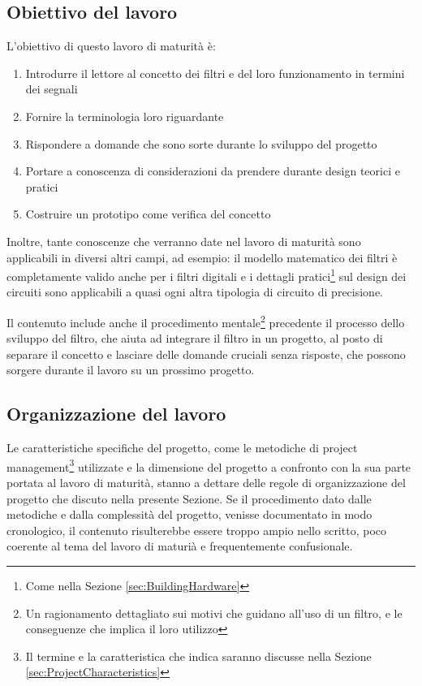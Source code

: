 \documentclass[a4paper, 10pt, final]{article} %
\begin{document}
    \subsection{Obiettivo del lavoro}\label{sec:IntroAim}
    \noindent L'obiettivo di questo lavoro di maturit\`{a} \`{e}:
    \begin{enumerate}[label=\emph{(\roman*)}]
        \item Introdurre il lettore al concetto dei filtri e del loro funzionamento in termini dei segnali
        \item Fornire la terminologia loro riguardante
        \item Rispondere a domande che sono sorte durante lo sviluppo del progetto
        \item Portare a conoscenza di considerazioni da prendere durante design teorici e pratici 
        \item Costruire un prototipo come verifica del concetto
    \end{enumerate}
    Inoltre, tante conoscenze che verranno date nel lavoro di maturit\`{a} sono applicabili in diversi altri campi, ad esempio: il modello matematico dei filtri \`{e} completamente valido anche per i filtri digitali e i dettagli pratici\footnote{Come nella Sezione \ref{sec:BuildingHardware}}  sul design dei circuiti sono applicabili a quasi ogni altra tipologia di circuito di precisione.
    
    Il contenuto include anche il procedimento mentale\footnote{Un ragionamento dettagliato sui motivi che guidano all'uso di un filtro, e le conseguenze che implica il loro utilizzo} precedente il processo dello sviluppo del filtro, che aiuta ad integrare il filtro in un progetto, al posto di separare il concetto e lasciare delle domande cruciali senza risposte, che possono sorgere durante il lavoro su un prossimo progetto.
    
    \subsection{Organizzazione del lavoro}\label{sec:IntroOrganization}
    Le caratteristiche specifiche del progetto, come le metodiche di project management\footnote{Il termine e la caratteristica che indica saranno discusse nella Sezione \ref{sec:ProjectCharacteristics}} utilizzate e la dimensione del progetto a confronto con la sua parte portata al lavoro di maturit\`{a}, stanno a dettare delle regole di organizzazione del progetto che discuto nella presente Sezione.
    Se il procedimento dato dalle metodiche e dalla complessit\`{a} del progetto, venisse documentato in modo cronologico, il contenuto risulterebbe essere troppo ampio nello scritto, poco coerente al tema del lavoro di maturi\`{a} e frequentemente confusionale.
    
\end{document}
